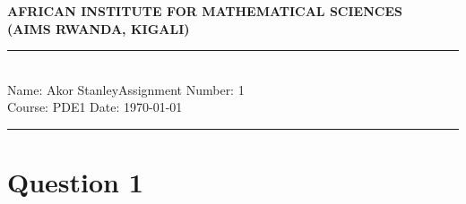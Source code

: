 \documentclass[12pt,a4paper]{article}
\newcommand{\student}{Akor Stanley}
\newcommand{\course}{PDE1 }
\newcommand{\assignment}{1}
\begin{document}
\thispagestyle{empty}
\begin{center}
\textbf{AFRICAN INSTITUTE FOR MATHEMATICAL SCIENCES \\[0.5cm]
(AIMS RWANDA, KIGALI)}
\vspace{1.0cm}
\end{center}
\noindent
\rule{17cm}{0.2cm}\\[0.3cm]
Name: \student \hfill Assignment Number: \assignment\\[0.1cm]
Course: \course \hfill Date: \today\\
\rule{17cm}{0.05cm}
\vspace{1.0cm}
\section*{Question 1}
\end{document}

